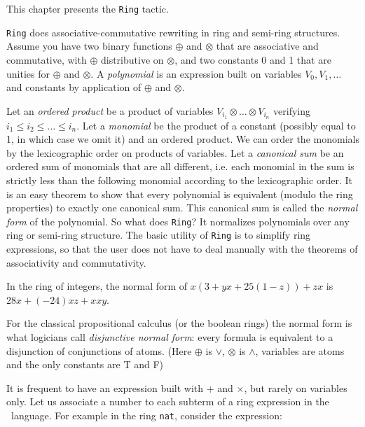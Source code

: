 \label{Ring}

This chapter presents  the \texttt{Ring} tactic.


\texttt{Ring} does associative-commutative rewriting in ring and semi-ring
structures. Assume you have two binary functions $\oplus$ and $\otimes$
that are associative and commutative, with $\oplus$ distributive on
$\otimes$, and two constants 0 and 1 that are unities for $\oplus$ and
$\otimes$. A \textit{polynomial} is an expression built on variables $V_0, V_1,
\dots$ and constants by application of $\oplus$ and $\otimes$.

Let an {\it ordered product} be a product of variables $V_{i_1} \otimes
\ldots \otimes V_{i_n}$ verifying $i_1 \le i_2 \le \dots \le i_n$. Let a
\textit{monomial} be the product of a constant (possibly equal to 1, in
which case we omit it) and an ordered product.  We can order the
monomials by the lexicographic order on products of variables. Let a
\textit{canonical sum} be an ordered sum of monomials that are all
different, i.e. each monomial in the sum is strictly less than the
following monomial according to the lexicographic order. It is an easy
theorem to show that every polynomial is equivalent (modulo the ring
properties) to exactly one canonical sum. This canonical sum is called
the \textit{normal form} of the polynomial. So what does \texttt{Ring}? It
normalizes polynomials over any ring or semi-ring structure. The basic
utility of \texttt{Ring} is to simplify ring expressions, so that the user
does not have to deal manually with the theorems of associativity and
commutativity.

\begin{Examples}
\item In the ring of integers, the normal form of 
$x (3 + yx + 25(1 - z)) + zx$ is $28x + (-24)xz + xxy$.
\item For the classical propositional calculus (or the boolean rings)
  the normal form is what logicians call \textit{disjunctive normal
    form}: every formula is equivalent to a disjunction of
  conjunctions of atoms. (Here $\oplus$ is $\vee$, $\otimes$ is
  $\wedge$, variables are atoms and the only constants are T and F)
\end{Examples}


It is frequent to have an expression built with + and
  $\times$, but rarely on variables only.
Let us associate a number to each subterm of a ring
expression in the \gallina\ language. For example in the ring
\texttt{nat}, consider the expression:

